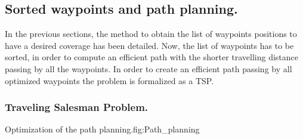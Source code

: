   \subsection{Sorted waypoints and path planning.} \label{sec:sorted}
In the previous sections, the method to obtain the list of waypoints positions to have a desired coverage has been detailed. Now, the list of waypoints has to be sorted, in order to compute an efficient path with the shorter travelling distance passing by all the waypoints. In order to create an efficient path passing by all optimized waypoints the problem is formalized as a TSP. %

 
\subsubsection*{Traveling Salesman Problem. }\label{sec:TSP2}


\begin{mfigures}[!]{Optimization of the path planning.}{fig:Path_planning} \centering
{}
\hspace{1cm}
\end{mfigures}	

